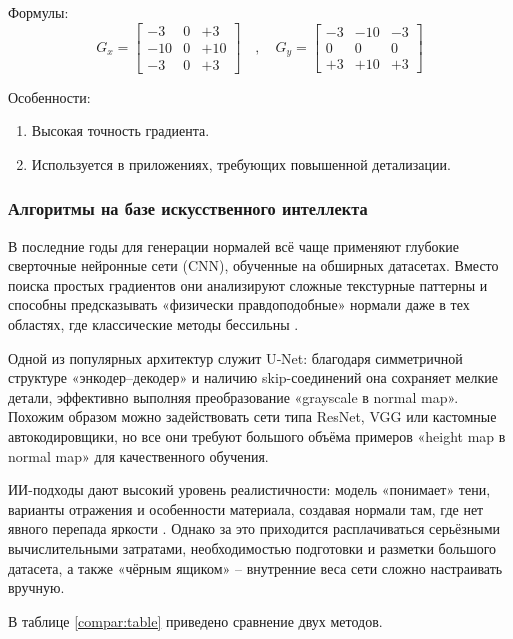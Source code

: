 Формулы:
\[
G_x =
\begin{bmatrix}
	-3 & 0 & +3 \\
	-10 & 0 & +10 \\
	-3 & 0 & +3
\end{bmatrix}
\quad , \quad
G_y =
\begin{bmatrix}
	-3 & -10 & -3 \\
	0 & 0 & 0 \\
	+3 & +10 & +3
\end{bmatrix}
\]

Особенности:
\begin{enumerate}
	\item Высокая точность градиента.
	\item Используется в приложениях, требующих повышенной детализации.
\end{enumerate}
\subsubsection{Алгоритмы на базе искусственного интеллекта}

В последние годы для генерации нормалей всё чаще применяют глубокие сверточные нейронные сети (CNN), обученные на обширных датасетах. Вместо поиска простых градиентов они анализируют сложные текстурные паттерны и способны предсказывать «физически правдоподобные» нормали даже в тех областях, где классические методы бессильны \cite{shafik2020}.

Одной из популярных архитектур служит U‑Net: благодаря симметричной структуре «энкодер–декодер» и наличию skip-соединений она сохраняет мелкие детали, эффективно выполняя преобразование «grayscale в normal map». Похожим образом можно задействовать сети типа ResNet, VGG или кастомные автокодировщики, но все они требуют большого объёма примеров «height map в normal map» для качественного обучения.

ИИ-подходы дают высокий уровень реалистичности: модель «понимает» тени, варианты отражения и особенности материала, создавая нормали там, где нет явного перепада яркости \cite{jehangiri2024}. Однако за это приходится расплачиваться серьёзными вычислительными затратами, необходимостью подготовки и разметки большого датасета, а также «чёрным ящиком» -- внутренние веса сети сложно настраивать вручную.

В таблице \ref{compar:table} приведено сравнение двух методов.

